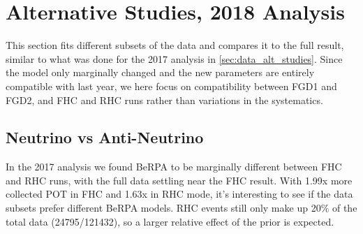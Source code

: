 \chapter{Alternative Studies, 2018 Analysis}
\label{chap:alt_studies_2018}
This section fits different subsets of the data and compares it to the full result, similar to what was done for the 2017 analysis in \autoref{sec:data_alt_studies}. Since the model only marginally changed and the new parameters are entirely compatible with last year, we here focus on compatibility between FGD1 and FGD2, and FHC and RHC runs rather than variations in the systematics.

\section{Neutrino vs Anti-Neutrino}
In the 2017 analysis we found BeRPA to be marginally different between FHC and RHC runs, with the full data settling near the FHC result. With 1.99x more collected POT in FHC and 1.63x in RHC mode, it's interesting to see if the data subsets prefer different BeRPA models. RHC events still only make up 20\% of the total data (24795/121432), so a larger relative effect of the prior is expected.

